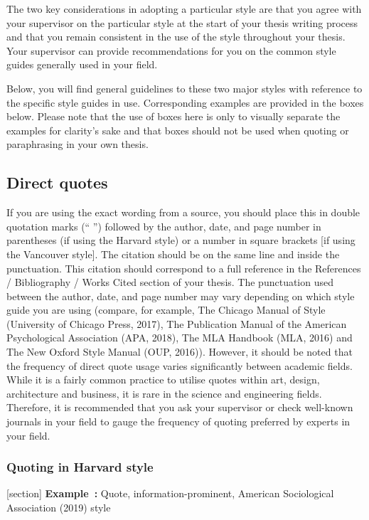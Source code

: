 \documentclass[english, 12pt, a4paper, elec, utf8, a-2b, online]{aaltothesis}
\begin{document}
The two key considerations in adopting a particular style are that you agree 
with your supervisor on the particular style at the start of your thesis writing
process and that you remain consistent in the use of the style throughout your 
thesis. Your supervisor can provide recommendations for you on the common style 
guides generally used in your field.

Below, you will find general guidelines to these two major styles with reference
to the specific style guides in use. Corresponding examples are provided in the 
boxes below. Please note that the use of boxes here is only to visually separate
the examples for clarity’s sake and that boxes should not be used when quoting 
or paraphrasing in your own thesis.


\subsection*{Direct quotes}

If you are using the exact wording from a source, you should place this in 
double quotation marks (“ ”) followed by the author, date, and page number in 
parentheses (if using the Harvard style) or a number in square brackets [if 
using the Vancouver style]. The citation should be on the same line and inside 
the punctuation. This citation should correspond to a full reference in the 
References / Bibliography / Works Cited section of your thesis. The punctuation 
used between the author, date, and page number may vary depending on which style
guide you are using (compare, for example, The Chicago Manual of Style 
(University of Chicago Press, 2017), The Publication Manual of the American 
Psychological Association (APA, 2018), The MLA Handbook (MLA, 2016) and The New 
Oxford Style Manual (OUP, 2016)). However, it should be noted that the frequency
of direct quote usage varies significantly between academic fields. While it is 
a fairly common practice to utilise quotes within art, design, architecture and 
business, it is rare in the science and engineering fields. Therefore, it is 
recommended that you ask your supervisor or check well-known journals in your 
field to gauge the frequency of quoting preferred by experts in your field.


\subsubsection*{Quoting in Harvard style}

[section]
\textsf{\textbf{Example~\theexample:}} Quote, information-prominent, American 
Sociological Association (2019) style
\end{document}
